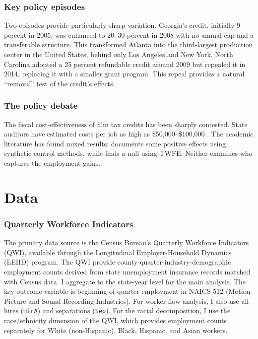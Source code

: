 \documentclass[12pt]{article}
\begin{document}
\subsubsection*{Key policy episodes} Two episodes provide particularly sharp variation. Georgia's credit, initially 9 percent in 2005, was enhanced to 20--30 percent in 2008 with no annual cap and a transferable structure. This transformed Atlanta into the third-largest production center in the United States, behind only Los Angeles and New York. North Carolina adopted a 25 percent refundable credit around 2009 but repealed it in 2014, replacing it with a smaller grant program. This repeal provides a natural ``removal'' test of the credit's effects.

\subsubsection*{The policy debate} The fiscal cost-effectiveness of film tax credits has been sharply contested. State auditors have estimated costs per job as high as \$50,000--\$100,000 \citep{tannenwald2010state}. The academic literature has found mixed results: \citet{thom2018green} documents some positive effects using synthetic control methods, while \citet{button2019producers} finds a null using TWFE. Neither examines who captures the employment gains.


\section{Data}
\label{sec:data}

\subsubsection*{Quarterly Workforce Indicators} The primary data source is the Census Bureau's Quarterly Workforce Indicators (QWI), available through the Longitudinal Employer-Household Dynamics (LEHD) program. The QWI provide county-quarter-industry-demographic employment counts derived from state unemployment insurance records matched with Census data. I aggregate to the state-year level for the main analysis. The key outcome variable is beginning-of-quarter employment in NAICS 512 (Motion Picture and Sound Recording Industries). For worker flow analysis, I also use all hires (\texttt{HirA}) and separations (\texttt{Sep}). For the racial decomposition, I use the race/ethnicity dimension of the QWI, which provides employment counts separately for White (non-Hispanic), Black, Hispanic, and Asian workers.
\end{document}
